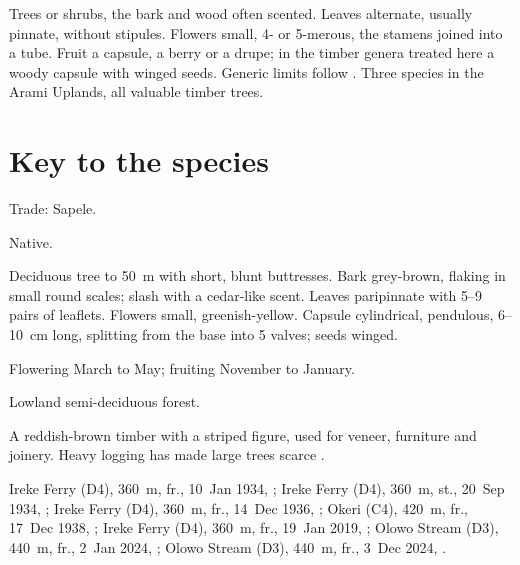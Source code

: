 \label{fam:meliaceae}

Trees or shrubs, the bark and wood often scented. Leaves alternate,
usually pinnate, without stipules. Flowers small, 4- or 5-merous, the
stamens joined into a tube. Fruit a capsule, a berry or a drupe; in
the timber genera treated here a woody capsule with winged seeds.
Generic limits follow \citet{pennington1975}. Three species in the
Arami Uplands, all valuable timber trees.

\section*{Key to the species}
\begin{florakey}
\end{florakey}

\label{sp:MEL01}

 

 Trade: Sapele.

 Native.

 Deciduous tree to 50~m with short, blunt
buttresses. Bark grey-brown, flaking in small round scales; slash with
a cedar-like scent. Leaves paripinnate with 5--9 pairs of leaflets.
Flowers small, greenish-yellow. Capsule cylindrical, pendulous,
6--10~cm long, splitting from the base into 5 valves; seeds winged.

 Flowering March to May; fruiting November to
January.

 Lowland semi-deciduous forest.

 A reddish-brown timber with a striped figure, used for
veneer, furniture and joinery. Heavy logging has made large trees
scarce \citep{hawthorne2006,louppe2008}.

 Ireke Ferry (D4), 360~m, fr., 10~Jan 1934, ;
Ireke Ferry (D4), 360~m, st., 20~Sep 1934, ;
Ireke Ferry (D4), 360~m, fr., 14~Dec 1936, ;
Okeri (C4), 420~m, fr., 17~Dec 1938, ;
Ireke Ferry (D4), 360~m, fr., 19~Jan 2019, ;
Olowo Stream (D3), 440~m, fr., 2~Jan 2024, ;
Olowo Stream (D3), 440~m, fr., 3~Dec 2024, .

